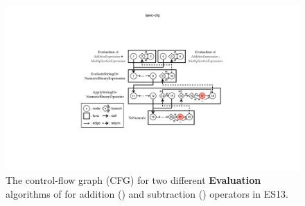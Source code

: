 \begin{figure}
  \centering
  \includegraphics[width=\textwidth]{img/spec-cfg}
  \caption{
    The control-flow graph (CFG) for two different \textbf{Evaluation}
    algorithms of  for addition (\scode{+}) and
    subtraction (\scode{-}) operators in ES13.
  }
  \label{fig:spec-cfg}
\end{figure}

\todo
